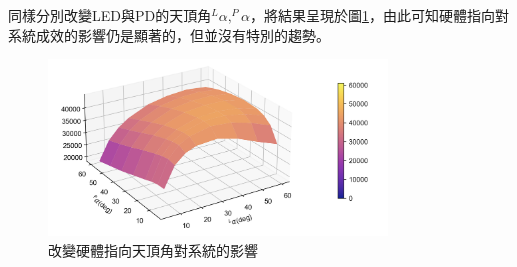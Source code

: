 同樣分別改變LED與PD的天頂角$^L \alpha,^P \alpha$，將結果呈現於圖\ref{pic:num5 alpha surface}，由此可知硬體指向對系統成效的影響仍是顯著的，但並沒有特別的趨勢。

\begin{figure}[htpb]
    \centering
    \includegraphics[width=9cm]{ch4pic/num5 alpha surface.png}
    \caption{改變硬體指向天頂角對系統的影響}
    \label{pic:num5 alpha surface}
\end{figure}









